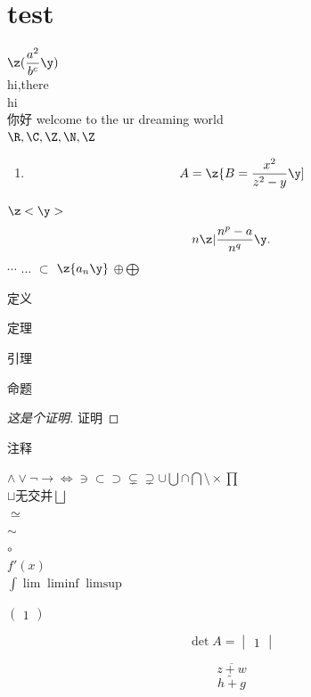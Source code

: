 \chapter{test}
$\displaystyle\z(\frac{a^2}{b^c}\y)$\\
hi,there\\hi\\你好
welcome to the ur dreaming world\\
$\R,\C,\Z,\N,\Z$
\begin{enumerate}
    \item \[A=\z\{B=\frac{x^2}{z^2-y}\y]\]
\end{enumerate}
$\z<\y>$
\[n \z| \frac{n^p-a}{n^q} \y.\]%
$\cdots$%
\(\ldots\)%
$\subset$
$\z\{a_n\y\}$
$\oplus\bigoplus$
\begin{definition}[这是个定义]
定义
\end{definition}

\begin{theorem}[这是个定理]
定理
\end{theorem}

\begin{lemma}[这是个引理]
引理
\end{lemma}

\begin{proposition}[这是个命题]
命题
\end{proposition}

\begin{proof}[这是个证明]
证明    
\end{proof}

\begin{remark}[这是个注]
注释
\end{remark}
$\land\lor\lnot\to\iff\ni\subset\supset\subsetneq\supsetneq\cup\bigcup\cap\bigcap\setminus\times\prod$\\$\sqcup$无交并$\bigsqcup$
\\$\simeq$\\$\sim$\\$\circ$\\$f'(x)$\\$\int\lim\liminf\limsup$

$\begin{pmatrix}
    1
\end{pmatrix}$

\[\det A=\begin{vmatrix}
    1
\end{vmatrix}\]

\[\overline{z+w}\]
\[\widetilde{h+g}\]

